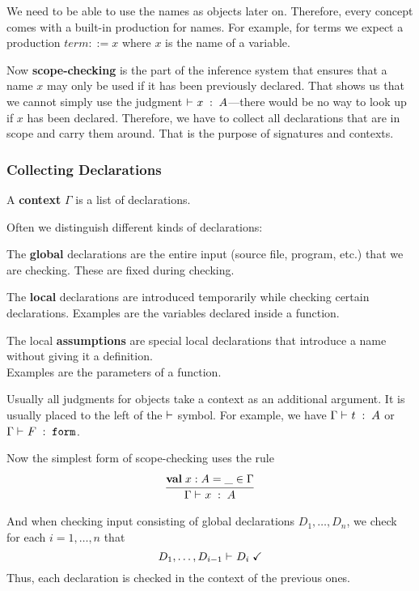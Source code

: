 We need to be able to use the names as objects later on.
Therefore, every concept comes with a built-in production for names.
For example, for terms we expect a production $term::=x$ where $x$ is the name of a variable.

Now \textbf{scope-checking} is the part of the inference system that ensures that a name $x$ may only be used if it has been previously declared.
That shows us that we cannot simply use the judgment $\vdash^{}_{}x\;:\;A$---there would be no way to look up if $x$ has been declared.
Therefore, we have to collect all declarations that are in scope and carry them around.
That is the purpose of signatures and contexts.

\subsubsection{Collecting Declarations}

A \textbf{context} $\Gamma$ is a list of declarations.

Often we distinguish different kinds of declarations:
\begin{compactitem}
 \item The \textbf{global} declarations are the entire input (source file, program, etc.) that we are checking.
 These are fixed during checking.
 \item The \textbf{local} declarations are introduced temporarily while checking certain declarations.
 Examples are the variables declared inside a function.
 \item The local \textbf{assumptions} are special local declarations that introduce a name without giving it a definition.\\
 Examples are the parameters of a function.
\end{compactitem}

Usually all judgments for objects take a context as an additional argument.
It is usually placed to the left of the $\vdash$ symbol.
For example, we have $\Gamma\vdash^{}_{}t\;:\;A$ or $\Gamma\vdash^{}_{}F\;:\;\mathtt{form}$.
\medskip

Now the simplest form of scope-checking uses the rule
\[\rul{\aval{x}{A}{\_}\in \Gamma}{\oftype{}{\Gamma}{x}{A}}\]

And when checking input consisting of global declarations $D_1,\ldots,D_n$, we check for each $i=1,\ldots,n$ that
 \[D_1,\ldots,D_{i-1}\vdash^{}_{}D_i\;\checkmark\]
Thus, each declaration is checked in the context of the previous ones.
\medskip

